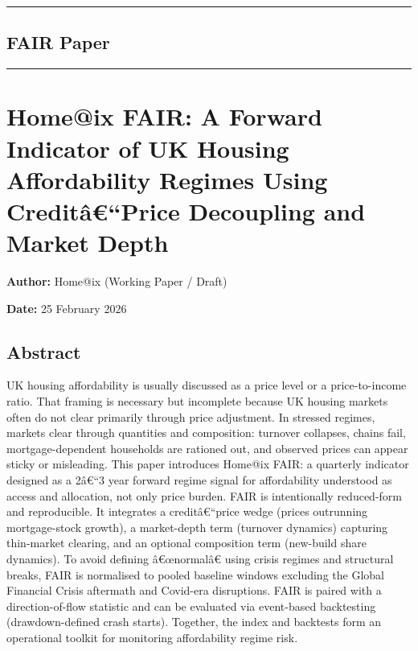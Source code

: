 \begin{center}\rule{0.5\linewidth}{0.5pt}\end{center}

\protect{}\label{fair}
\subsection{FAIR Paper}\label{fair-paper}

\begin{center}\rule{0.5\linewidth}{0.5pt}\end{center}

\section{\texorpdfstring{\textbf{Home@ix FAIR:} A Forward Indicator of
UK Housing Affordability Regimes Using Creditâ€``Price Decoupling and
Market
Depth}{Home@ix FAIR: A Forward Indicator of UK Housing Affordability Regimes Using Creditâ€``Price Decoupling and Market Depth}}\label{homeix-fair-a-forward-indicator-of-uk-housing-affordability-regimes-using-credituxe2price-decoupling-and-market-depth}

\textbf{Author:} Home@ix (Working Paper / Draft)

\textbf{Date:} 25 February 2026

\subsection{Abstract}\label{abstract-1}

UK housing affordability is usually discussed as a price level or a
price-to-income ratio. That framing is necessary but incomplete because
UK housing markets often do not clear primarily through price
adjustment. In stressed regimes, markets clear through quantities and
composition: turnover collapses, chains fail, mortgage-dependent
households are rationed out, and observed prices can appear sticky or
misleading. This paper introduces Home@ix FAIR: a quarterly indicator
designed as a 2â€``3 year forward regime signal for affordability
understood as access and allocation, not only price burden. FAIR is
intentionally reduced-form and reproducible. It integrates a
creditâ€``price wedge (prices outrunning mortgage-stock growth), a
market-depth term (turnover dynamics) capturing thin-market clearing,
and an optional composition term (new-build share dynamics). To avoid
defining â€œnormalâ€ using crisis regimes and structural breaks, FAIR is
normalised to pooled baseline windows excluding the Global Financial
Crisis aftermath and Covid-era disruptions. FAIR is paired with a
direction-of-flow statistic and can be evaluated via event-based
backtesting (drawdown-defined crash starts). Together, the index and
backtests form an operational toolkit for monitoring affordability
regime risk.

